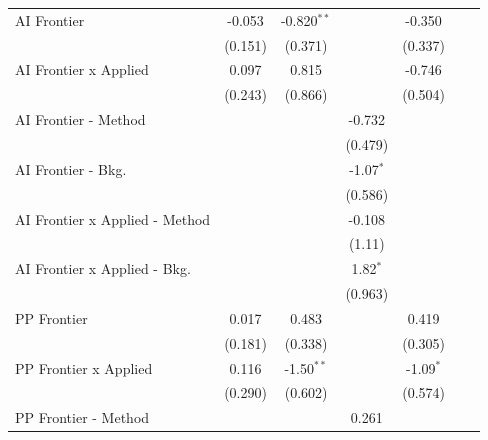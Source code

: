 \begin{tabular}{lcccccc}
   AI Frontier                    & -0.053       & -0.820$^{**}$ &              & -0.350       &        &   \\   
                                  & (0.151)      & (0.371)       &              & (0.337)      &        &   \\   
   AI Frontier x Applied          & 0.097        & 0.815         &              & -0.746       &        &   \\   
                                  & (0.243)      & (0.866)       &              & (0.504)      &        &   \\   
   AI Frontier - Method           &              &               & -0.732       &              &        &   \\   
                                  &              &               & (0.479)      &              &        &   \\   
   AI Frontier - Bkg.             &              &               & -1.07$^{*}$  &              &        &   \\   
                                  &              &               & (0.586)      &              &        &   \\   
   AI Frontier x Applied - Method &              &               & -0.108       &              &        &   \\   
                                  &              &               & (1.11)       &              &        &   \\   
   AI Frontier x Applied - Bkg.   &              &               & 1.82$^{*}$   &              &        &   \\   
                                  &              &               & (0.963)      &              &        &   \\   
   PP Frontier                    & 0.017        & 0.483         &              & 0.419        &        &   \\   
                                  & (0.181)      & (0.338)       &              & (0.305)      &        &   \\   
   PP Frontier x Applied          & 0.116        & -1.50$^{**}$  &              & -1.09$^{*}$  &        &   \\   
                                  & (0.290)      & (0.602)       &              & (0.574)      &        &   \\   
   PP Frontier - Method           &              &               & 0.261        &              &        &   \\   

\end{tabular}
